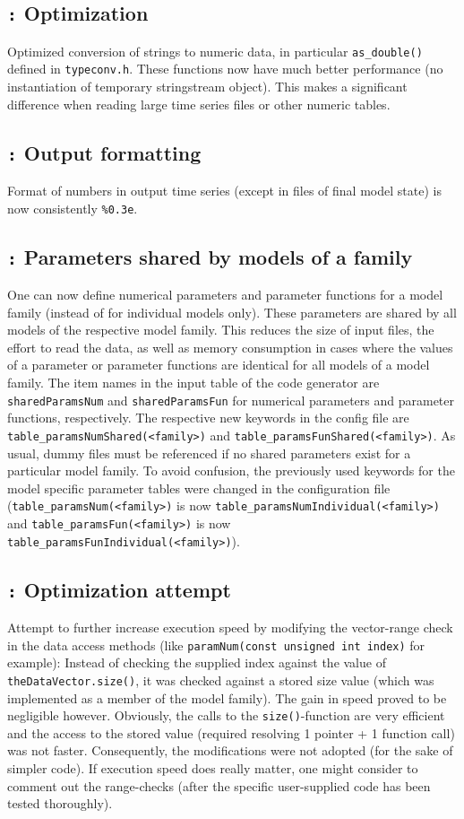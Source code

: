 \documentclass[a4paper,10pt]{article}
\newcommand{\logentry}[2]{\subsection*{\texttt{\color{red}{#1}:} \large{\textbf{#2}}}}
\begin{document}

\logentry{2011-08-15}{Optimization}
Optimized conversion of strings to numeric data, in particular \verb!as_double()! defined in \verb!typeconv.h!. These functions now have much better performance (no instantiation of temporary stringstream object). This makes a significant difference when reading large time series files or other numeric tables.


\logentry{2011-08-15}{Output formatting}
Format of numbers in output time series (except in files of final model state) is now consistently \verb!%0.3e!.


\logentry{2011-08-12}{Parameters shared by models of a family}
One can now define numerical parameters and parameter functions for a model family (instead of for individual models only). These parameters are shared by all models of the respective model family. This reduces the size of input files, the effort to read the data, as well as memory consumption in cases where the values of a parameter or parameter functions are identical for all models of a model family. The item names in the input table of the code generator are \verb!sharedParamsNum! and \verb!sharedParamsFun! for numerical parameters and parameter functions, respectively. The respective new keywords in the config file are \verb!table_paramsNumShared(<family>)! and \verb!table_paramsFunShared(<family>)!. As usual, dummy files must be referenced if no shared parameters exist for a particular model family. To avoid confusion, the previously used keywords for the model specific parameter tables were changed in the configuration file (\verb!table_paramsNum(<family>)! is now \verb!table_paramsNumIndividual(<family>)! and \verb!table_paramsFun(<family>)! is now \verb!table_paramsFunIndividual(<family>)!).


\logentry{2011-08-05}{Optimization attempt}
Attempt to further increase execution speed by modifying the vector-range check in the data access methods (like \verb!paramNum(const unsigned int index)! for example): Instead of checking the supplied index against the value of \verb!theDataVector.size()!, it was checked against a stored size value (which was implemented as a member of the model family). The gain in speed proved to be negligible however. Obviously, the calls to the \verb!size()!-function are very efficient and the access to the stored value (required resolving 1 pointer + 1 function call) was not faster. Consequently, the modifications were not adopted (for the sake of simpler code). If execution speed does really matter, one might consider to comment out the range-checks (after the specific user-supplied code has been tested thoroughly).
\end{document}
